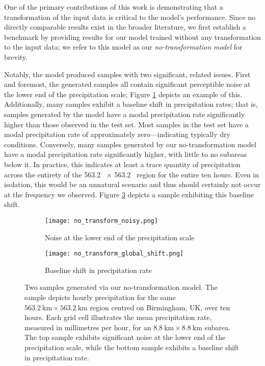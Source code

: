\documentclass[ oneside,%
                    author={George Herbert},
                    degree={MSci},
                     title={Diffusion Models for Time-Evolving Precipitation Fields},
                  subtitle={}]{dissertation}
\begin{document}
One of the primary contributions of this work is demonstrating that a transformation of the input data is critical to the model's performance. Since no directly comparable results exist in the broader literature, we first establish a benchmark by providing results for our model trained without any transformation to the input data; we refer to this model as our \textit{no-transformation model} for brevity.

Notably, the model produced samples with two significant, related issues. First and foremost, the generated samples all contain significant perceptible noise at the lower end of the precipitation scale; Figure \ref{fig:no_transform_sample} depicts an example of this. Additionally, many samples exhibit a baseline shift in precipitation rates; that is, samples generated by the model have a modal precipitation rate significantly higher than those observed in the test set. Most samples in the test set have a modal precipitation rate of approximately zero---indicating typically dry conditions. Conversely, many samples generated by our no-transformation model have a modal precipitation rate significantly higher, with little to no subareas below it. In practice, this indicates at least a trace quantity of precipitation across the entirety of the 563.2\  $\times$ 563.2\  region for the entire ten hours. Even in isolation, this would be an unnatural scenario and thus should certainly not occur at the frequency we observed. Figure \ref{fig:no_transform_global_shift} depicts a sample exhibiting this baseline shift.

\begin{figure}[htbp]
      \centering
      \begin{subfigure}{\textwidth}
            \texttt{[image: no\_transform\_noisy.png]}
            \caption{Noise at the lower end of the precipitation scale}
            \label{fig:no_transform_sample}
      \end{subfigure}
      \begin{subfigure}{\textwidth}
            \texttt{[image: no\_transform\_global\_shift.png]}
            \caption{Baseline shift in precipitation rate}
            \label{fig:no_transform_global_shift}
      \end{subfigure}
      \caption{Two samples generated via our no-transformation model. The sample depicts hourly precipitation for the same $563.2\ \mathrm{km} \times 563.2\ \mathrm{km}$ region centred on Birmingham, UK, over ten hours. Each grid cell illustrates the mean precipitation rate, measured in millimetres per hour, for an $8.8 \ \mathrm{km} \times 8.8\ \mathrm{km}$ subarea. The top sample exhibits significant noise at the lower end of the precipitation scale, while the bottom sample exhibits a baseline shift in precipitation rate.}
\end{figure}
\end{document}
